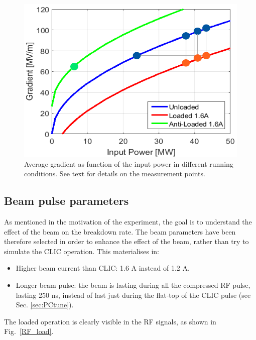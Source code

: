 \begin{figure}[t]
\centering 
\includegraphics[scale=0.7]{pictures/grad_vs_inPow.png}
\caption{Average gradient as function of the input power in different running conditions. See text for details on the measurement points. }
\label{g_IP}
\end{figure}


\subsection[Beam pulse parameters]{Beam pulse parameters}

As mentioned in the motivation of the experiment, the goal is to understand the effect of the beam on the breakdown rate. The beam parameters have been therefore selected in order to enhance the effect of the beam, rather than try to simulate the CLIC operation. This materialises in:
\begin{itemize}
\item Higher beam current than CLIC: 1.6 A instead of 1.2 A.
\item Longer beam pulse: the beam is lasting during all the compressed RF pulse, lasting 250 ns, instead of last just during the flat-top of the CLIC pulse (see Sec. \ref{sec:PCtune}).
\end{itemize}

\noindent
The loaded operation is clearly visible  in the RF signals, as shown in Fig.~\ref{RF_load}.

